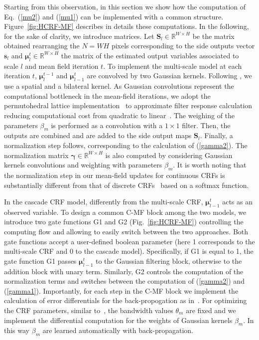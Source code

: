 \documentclass[10pt,twocolumn,letterpaper]{article}
\begin{document}
Starting from this observation, in this section we show how the computation of Eq.~(\ref{mu2}) and (\ref{mu1}) can be implemented 
with a common structure. 
Figure~\ref{fig:HCRF-MF} describes in details these computations. In the following, for the sake of
clarity, we introduce matrices. Let ${\mathbf{S}}_l \in \mathbb{R}^{W\times H}$ be the matrix obtained rearranging 
the $N=WH$ pixels corresponding to the side outputs vector $\mathbf{s}_l$ and $\boldsymbol{\mu}_l^t \in \mathbb{R}^{W\times H}$ 
the matrix of the estimated output variables associated to scale $l$ and mean field iteration $t$.
To implement the multi-scale model at each iteration $t$, $\boldsymbol{\mu}_l^{t-1}$ and $\boldsymbol{\mu}_{l-1}^t$ are convolved 
by two Gaussian kernels. Following \cite{koltun2011efficient}, we use a spatial and a bilateral kernel. As Gaussian convolutions 
represent the computational bottleneck in the mean-field iterations, 
we adopt the permutohedral lattice implementation~\cite{adams2010fast} to approximate
filter response calculation reducing computational cost from quadratic to linear~\cite{ristovski2013continuous}.
The weighing of the parameters $\beta_m$ is performed as a convolution with a $1 \times 1$ filter.
Then, the outputs are combined and are added to the side output maps $\mathbf{S}_l$. 
Finally, a normalization step follows, corresponding to the calculation of (\ref{gamma2}). The normalization matrix 
$\boldsymbol{\gamma} \in \mathbb{R}^{W \times H}$ is also computed by considering Gaussian kernels convolutions and 
weighting with parameters $\beta_m$. It is worth noting that the normalization step in our mean-field updates for 
continuous CRFs is substantially different from that of discrete CRFs~\cite{zheng2015conditional} based on a softmax function. 

In the cascade CRF model, differently from the multi-scale CRF, $\boldsymbol{\mu}_{l-1}^t$ acts as an observed variable. To design a common C-MF block among the two models, we introduce two gate functions G1 and G2 (Fig.~\ref{fig:HCRF-MF}) controlling the computing flow and allowing to easily switch between the two approaches. Both gate functions accept a user-defined boolean parameter (here 1 corresponds to the multi-scale CRF and 0 to the cascade model). Specifically, if G1 is equal to 1, the gate function 
G1 passes $\boldsymbol{\mu}_{l-1}^{t}$ to the Gaussian filtering block, otherwise to the addition block with unary term. 
Similarly, G2 controls the computation of the normalization terms and switches between the computation of (\ref{gamma2}) 
and (\ref{gamma1}). Importantly, for each step in the C-MF block we implement the calculation of error differentials for 
the back-propogation as in~\cite{zheng2015conditional}. For optimizing the CRF parameters, similar to~\cite{zheng2015conditional}, the 
bandwidth values $\theta_m$ are fixed and we implement the differential computation for the weights of Gaussian kernels $\beta_m$.
In this way $\beta_{m}$ are learned automatically with back-propagation.
\vspace{-0.5cm}
\end{document}
